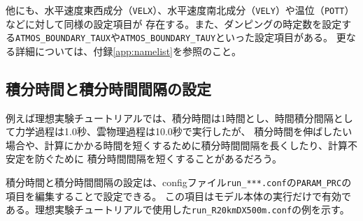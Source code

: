 他にも、水平速度東西成分（\verb|VELX|）、水平速度南北成分（\verb|VELY|）や温位（\verb|POTT|）などに対して同様の設定項目が
存在する。また、ダンピングの時定数を設定する\verb|ATMOS_BOUNDARY_TAUX|や\verb|ATMOS_BOUNDARY_TAUY|といった設定項目がある。
更なる詳細については、付録\ref{app:namelist}を参照のこと。




\subsection{積分時間と積分時間間隔の設定} \label{sec:adv_timeintiv}
例えば理想実験チュートリアルでは、積分時間は1時間とし、時間積分間隔として力学過程は1.0秒、雲物理過程は10.0秒で実行したが、
積分時間を伸ばしたい場合や、計算にかかる時間を短くするために積分時間間隔を長くしたり、計算不安定を防ぐために
積分時間間隔を短くすることがあるだろう。

積分時間と積分時間間隔の設定は、configファイル\verb|run_***.conf|の\verb|PARAM_PRC|の項目を編集することで設定できる。
この項目はモデル本体の実行だけで有効である。理想実験チュートリアルで使用した\verb|run_R20kmDX500m.conf|の例を示す。\\

